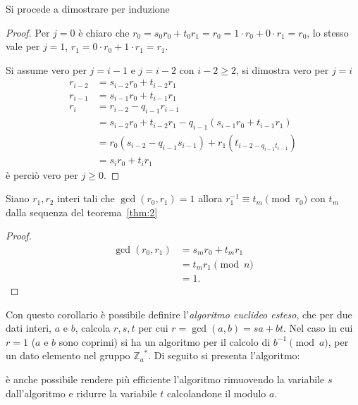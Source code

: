 \vspace{1em}
\noindent Si procede a dimostrare per induzione
\begin{proof}
    Per $j = 0$ è chiaro che $r_0 = s_0 r_0 + t_0 r_1 = r_0  = 1 \cdot r_0 + 0 \cdot r_1 = \boxed{r_0}$, lo stesso vale per $j = 1$, $r_1 = 0 \cdot r_0 + 1 \cdot r_1 = \boxed{r_1}$.
    
    \vspace{1em}\noindent
    Si assume vero per $j = i-1$ e $j = i-2$ con $i-2 \geq 2$, si dimostra vero per $j = i$
    \begin{align*}        
        r_{i-2} &= s_{i-2}r_0 + t_{i-2}r_1\\
        r_{i-1} &= s_{i-1}r_0 + t_{i-1}r_1\\
        r_i &= r_{i-2} - q_{i-1}r_{i-1}\\
        &= s_{i-2}r_0 + t_{i-2}r_1 - q_{i-1}(s_{i-1}r_0 + t_{i-1}r_1)\\
        &= r_0(s_{i-2} - q_{i-1}s_{i-1}) + r_1(t_{i-2-q_{i-1}t_{i-1}})\\
        & = s_i r_0 + t_i r_1
    \end{align*}
    è perciò vero per $j \geq 0$.
\end{proof}
\begin{corollary}
    Siano $r_1, r_2$ interi tali che $\gcd(r_0,r_1) = 1$ allora $r_1^{-1} \equiv t_m \pmod{r_0}$ con $t_m$ dalla sequenza del teorema~\ref{thm:2}
\end{corollary}
\begin{proof}
    \begin{align*}
        \gcd(r_0,r_1) &= s_m r_0 + t_m r_1\\
        &= t_m r_1 \pmod n\\
        &= 1.
    \end{align*}
\end{proof}
Con questo corollario è possibile definire l'\emph{algoritmo euclideo esteso}, che per due dati interi, $a$ e $b$, calcola $r,s,t$ per cui $r  =\gcd(a,b) = sa + bt$. Nel caso in cui $r = 1$ ($a$ e $b$ sono coprimi) si ha un algoritmo per il calcolo di $b^{-1} \pmod a$, per un dato elemento nel gruppo ${\mathbb{Z}_a}^*$. Di seguito si presenta l'algoritmo:



\noindent
è anche possibile rendere più efficiente l'algoritmo rimuovendo la variabile $s$ dall'algoritmo e ridurre la variabile $t$ calcolandone il modulo $a$.

